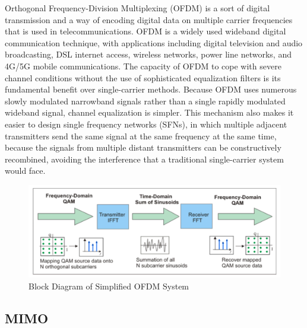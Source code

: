 Orthogonal Frequency-Division Multiplexing (OFDM) is a sort of digital transmission and a way of encoding digital data on multiple carrier frequencies that is used in telecommunications. OFDM is a widely used wideband digital communication technique, with applications including digital television and audio broadcasting, DSL internet access, wireless networks, power line networks, and 4G/5G mobile communications.\cite{1}
The capacity of OFDM to cope with severe channel conditions without the use of sophisticated equalization filters is its fundamental benefit over single-carrier methods. Because OFDM uses numerous slowly modulated narrowband signals rather than a single rapidly modulated wideband signal, channel equalization is simpler. This mechanism also makes it easier to design single frequency networks (SFNs), in which multiple adjacent transmitters send the same signal at the same frequency at the same time, because the signals from multiple distant transmitters can be constructively recombined, avoiding the interference that a traditional single-carrier system would face.

\begin{figure}[H]
\centering
\includegraphics[width=1.0\textwidth]{./figure/chap 3/ofdm.png}
\caption{Block Diagram of Simplified OFDM  System}
\label{Fig 3.3}
\end{figure}

\subsection{MIMO}

